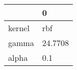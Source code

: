 \begin{tabular}{ll}
\toprule
{} &        0 \\
\midrule
kernel &      rbf \\
gamma  &  24.7708 \\
alpha  &      0.1 \\
\bottomrule
\end{tabular}
